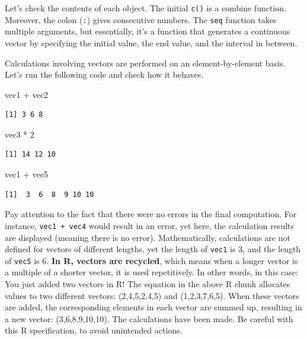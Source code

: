 \documentclass[
  a4paper,
]{book}
\newenvironment{Shaded}{\begin{snugshade}}{\end{snugshade}}
\newcommand{\DecValTok}[1]{\textcolor[rgb]{0.68,0.00,0.00}{#1}}
\newcommand{\NormalTok}[1]{\textcolor[rgb]{0.00,0.23,0.31}{#1}}
\newcommand{\SpecialCharTok}[1]{\textcolor[rgb]{0.37,0.37,0.37}{#1}}
\begin{document}
Let's check the contents of each object. The initial \texttt{c()} is a
combine function. Moreover, the colon (\texttt{:}) gives consecutive
numbers. The \texttt{seq} function takes multiple arguments, but
essentially, it's a function that generates a continuous vector by
specifying the initial value, the end value, and the interval in
between.

Calculations involving vectors are performed on an element-by-element
basis. Let's run the following code and check how it behaves.

\begin{Shaded}
\begin{Highlighting}[]
\NormalTok{vec1 }\SpecialCharTok{+}\NormalTok{ vec2}
\end{Highlighting}
\end{Shaded}

\begin{verbatim}
[1] 3 6 8
\end{verbatim}

\begin{Shaded}
\begin{Highlighting}[]
\NormalTok{vec3 }\SpecialCharTok{*} \DecValTok{2}
\end{Highlighting}
\end{Shaded}

\begin{verbatim}
[1] 14 12 10
\end{verbatim}

\begin{Shaded}
\begin{Highlighting}[]
\NormalTok{vec1 }\SpecialCharTok{+}\NormalTok{ vec5}
\end{Highlighting}
\end{Shaded}

\begin{verbatim}
[1]  3  6  8  9 10 10
\end{verbatim}

Pay attention to the fact that there were no errors in the final
computation. For instance, \texttt{vec1\ +\ vec4} would result in an
error, yet here, the calculation results are displayed (meaning there is
no error). Mathematically, calculations are not defined for vectors of
different lengths, yet the length of \texttt{vec1} is 3, and the length
of \texttt{vec5} is 6. \textbf{In R, vectors are recycled}, which means
when a longer vector is a multiple of a shorter vector, it is used
repetitively. In other words, in this case: You just added two vectors
in R! The equation in the above R chunk allocates values to two
different vectors: (2,4,5,2,4,5) and (1,2,3,7,6,5). When these vectors
are added, the corresponding elements in each vector are summed up,
resulting in a new vector: (3,6,8,9,10,10). The calculations have been
made. Be careful with this R specification, to avoid unintended actions.
\end{document}

